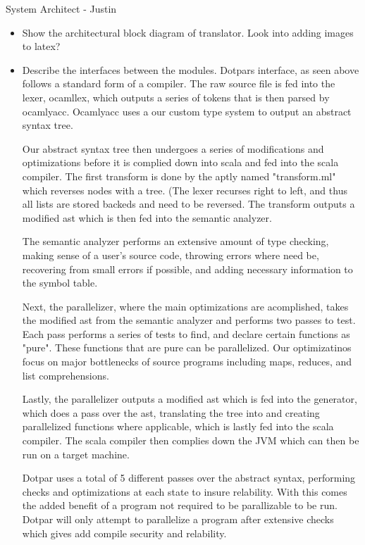 System Architect - Justin
\begin{itemize}
\item Show the architectural block diagram of translator.
Look into adding images to latex?

\item Describe the interfaces between the modules.
Dotpars interface, as seen above follows a standard form of a compiler. The raw
source file is fed into the lexer, ocamllex, which outputs a series of tokens that is then
parsed by ocamlyacc.  Ocamlyacc uses a our custom type system to output an abstract
syntax tree.

Our abstract syntax tree then undergoes a series of modifications and optimizations before it
is complied down into scala and fed into the scala compiler.  The first transform
is done by the aptly named "transform.ml" which reverses nodes with a tree.  (The lexer
recurses right to left, and thus all lists are stored backeds and need to be reversed.
The transform outputs a modified ast which is then fed into the semantic analyzer.

The semantic analyzer performs an extensive amount of type checking, making 
sense of a user's source code, throwing errors where need be, recovering from 
small errors if possible,  and adding necessary information to the symbol table.  

Next, the parallelizer, where the main optimizations are acomplished, takes 
the modified ast from the semantic analyzer and performs two passes to test. 
Each pass performs a series of tests to find, and declare certain functions as "pure".
These functions that are pure can be parallelized. Our optimizatinos focus on major
bottlenecks of source programs including maps, reduces, and list comprehensions.

Lastly, the parallelizer outputs a modified ast which is fed into the generator, 
which does a pass over the ast, translating the tree into and creating parallelized 
functions where applicable, which is lastly fed into the scala compiler.  The
scala compiler then complies down the JVM which can then be run on a target machine.

Dotpar uses a total of 5 different passes over the abstract syntax, performing 
checks and optimizations at each state to insure relability.  With this comes
the added benefit of a program not required to be parallizable to be run.  Dotpar
will only attempt to parallelize a program after extensive checks which gives add 
compile security and relability.


\end{itemize}
